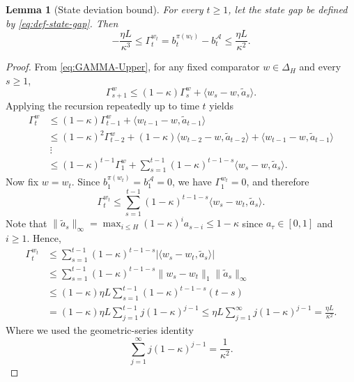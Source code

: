 \documentclass[11pt]{article}
\newtheorem{lemma}{Lemma}
\begin{document}
\begin{lemma}[State deviation bound]
\label{lem:state-gap-bound}
For every $t\ge 1$, let the state gap be defined by \eqref{eq:def-state-gap}. Then
\[
-\frac{\eta L}{\kappa^3}
\le
\Gamma_t^{w_t}
=
b_t^{\pi(w_t)}-b_t^{\mathcal A}
\le
\frac{\eta L}{\kappa^2}.
\]
\end{lemma}

\begin{proof}
From \eqref{eq:GAMMA-Upper}, for any fixed comparator $w\in\Delta_H$ and every $s\ge 1$,
\[
\Gamma_{s+1}^{w}
\le
(1-\kappa)\Gamma_s^{w} + \langle w_s-w,\widetilde a_s\rangle.
\]
Applying the recursion repeatedly up to time $t$ yields
\[
\begin{aligned}
\Gamma_t^{w}
&\le (1-\kappa)\Gamma_{t-1}^{w} + \langle w_{t-1}-w,\widetilde a_{t-1}\rangle \\
&\le (1-\kappa)^2\Gamma_{t-2}^{w} + (1-\kappa)\langle w_{t-2}-w,\widetilde a_{t-2}\rangle + \langle w_{t-1}-w,\widetilde a_{t-1}\rangle \\
&\ \vdots \\
&\le (1-\kappa)^{t-1}\Gamma_1^{w} + \sum_{s=1}^{t-1}(1-\kappa)^{t-1-s}\langle w_s-w,\widetilde a_s\rangle.
\end{aligned}
\]
Now fix $w=w_t$. 
Since $b_1^{\pi(w_t)}=b_1^{\mathcal A}=0$, we have $\Gamma_1^{w_t}=0$, and therefore
\[
\Gamma_t^{w_t}
\le
\sum_{s=1}^{t-1}(1-\kappa)^{t-1-s}\langle w_s-w_t,\widetilde a_s\rangle.
\]
Note that $\|\widetilde a_s\|_\infty = \max_{i\le H}(1-\kappa)^i a_{s-i} \le 1-\kappa$ since $a_\tau\in[0,1]$ and $i\ge1$. Hence,
\[
\begin{aligned}
\Gamma_t^{w_t}
&\le \sum_{s=1}^{t-1}(1-\kappa)^{t-1-s}\bigl|\langle w_s-w_t,\widetilde a_s\rangle\bigr| \\
&\le \sum_{s=1}^{t-1}(1-\kappa)^{t-1-s}\|w_s-w_t\|_1\|\widetilde a_s\|_\infty \\
&\le (1-\kappa)\eta L\sum_{s=1}^{t-1}(1-\kappa)^{t-1-s}(t-s) \\
&= (1-\kappa)\eta L\sum_{j=1}^{t-1} j(1-\kappa)^{j-1}
\le \eta L\sum_{j=1}^{\infty} j(1-\kappa)^{j-1}
= \frac{\eta L}{\kappa^2}.
\end{aligned}
\]
Where we used the geometric-series identity
\[
\sum_{j=1}^{\infty} j(1-\kappa)^{j-1} = \frac{1}{\kappa^2}.
\]


\end{proof}
\end{document}
